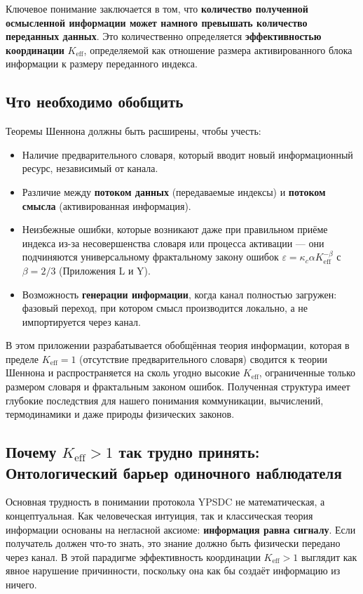\documentclass[12pt,a4paper]{article}
\theoremstyle{remark}
\newcommand{\Keff}{K_{\mathrm{eff}}}
\begin{document}
	Ключевое понимание заключается в том, что \textbf{количество полученной осмысленной информации может намного превышать количество переданных данных}. Это количественно определяется \textbf{эффективностью координации} $\Keff$, определяемой как отношение размера активированного блока информации к размеру переданного индекса.
	
	\subsection{Что необходимо обобщить}
	
	Теоремы Шеннона должны быть расширены, чтобы учесть:
	\begin{itemize}
		\item Наличие предварительного словаря, который вводит новый информационный ресурс, независимый от канала.
		\item Различие между \textbf{потоком данных} (передаваемые индексы) и \textbf{потоком смысла} (активированная информация).
		\item Неизбежные ошибки, которые возникают даже при правильном приёме индекса из-за несовершенства словаря или процесса активации — они подчиняются универсальному фрактальному закону ошибок $\varepsilon = \kappa_c\alpha K_{\mathrm{eff}}^{-\beta}$ с $\beta=2/3$ (Приложения L и Y).
		\item Возможность \textbf{генерации информации}, когда канал полностью загружен: фазовый переход, при котором смысл производится локально, а не импортируется через канал.
	\end{itemize}
	
	В этом приложении разрабатывается обобщённая теория информации, которая в пределе $\Keff = 1$ (отсутствие предварительного словаря) сводится к теории Шеннона и распространяется на сколь угодно высокие $\Keff$, ограниченные только размером словаря и фрактальным законом ошибок. Полученная структура имеет глубокие последствия для нашего понимания коммуникации, вычислений, термодинамики и даже природы физических законов.
	
	\subsection{Почему \(K_{\mathrm{eff}} > 1\) так трудно принять: 
		Онтологический барьер одиночного наблюдателя}
	
	Основная трудность в понимании протокола YPSDC не математическая, а концептуальная. Как человеческая интуиция, так и классическая теория информации основаны на негласной аксиоме: \textbf{информация равна сигналу}. Если получатель должен что-то знать, это знание должно быть физически передано через канал. В этой парадигме эффективность координации \(K_{\mathrm{eff}} > 1\) выглядит как явное нарушение причинности, поскольку она как бы создаёт информацию из ничего.
	
\end{document}
